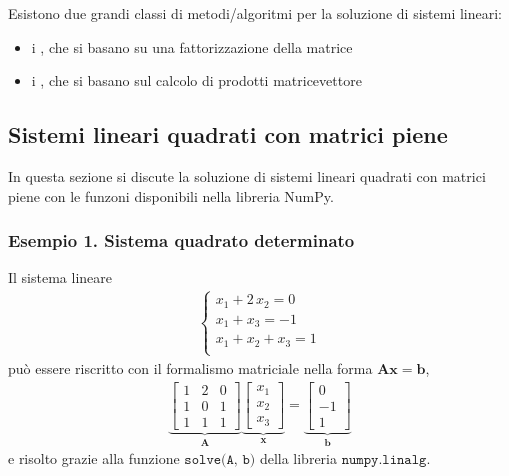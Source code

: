 \documentclass[letterpaper,10pt,english]{jupyterBook}
\begin{document}
\sphinxAtStartPar
{} Esistono due grandi classi di metodi/algoritmi per la soluzione di sistemi lineari:
\begin{itemize}
\item {} 
\sphinxAtStartPar
i , che si basano su una fattorizzazione della matrice

\item {} 
\sphinxAtStartPar
i , che si basano sul calcolo di prodotti matrice\sphinxhyphen{}vettore

\end{itemize}


\subsection{Sistemi lineari quadrati con matrici piene}
\label{\detokenize{ch/numerics/linear:sistemi-lineari-quadrati-con-matrici-piene}}
\sphinxAtStartPar
In questa sezione si discute la soluzione di sistemi lineari quadrati con matrici piene con le funzoni disponibili nella libreria NumPy.


\subsubsection{Esempio 1. Sistema quadrato determinato}
\label{\detokenize{ch/numerics/linear:esempio-1-sistema-quadrato-determinato}}
\sphinxAtStartPar
Il sistema lineare
\begin{equation*}
\begin{split}\begin{cases}
  x_1 + 2 \, x_2 = 0 \\
  x_1 + x_3 = -1 \\
  x_1 + x_2 + x_3 = 1 \\
\end{cases}\end{split}
\end{equation*}
\sphinxAtStartPar
può essere riscritto con il formalismo matriciale nella forma \(\mathbf{A} \mathbf{x} = \mathbf{b}\),
\begin{equation*}
\begin{split}
\underbrace{\begin{bmatrix} 1 & 2 & 0 \\ 1 & 0 & 1 \\ 1 & 1 & 1 \end{bmatrix}}_{\mathbf{A}}
\underbrace{\begin{bmatrix} x_1 \\ x_2 \\ x_3 \end{bmatrix}}_{\mathbf{x}} =
\underbrace{\begin{bmatrix} 0 \\ -1 \\ 1 \end{bmatrix}}_{\mathbf{b}}
\end{split}
\end{equation*}
\sphinxAtStartPar
e risolto grazie alla funzione \(\texttt{solve(A, b)}\) della libreria \(\texttt{numpy.linalg}\).
\end{document}

